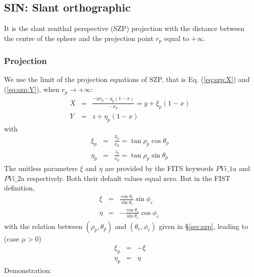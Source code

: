 \subsection{SIN: Slant orthographic}

  It is the slant zenithal perspective (SZP) projection with the distance 
  between the centre of the sphere and the projection point $r_p$ equal to $+\infty$.

  \subsubsection{Projection}

    We use the limit of the projection equations of SZP, that is Eq. (\ref{eq:szp:X}) and (\ref{eq:szp:Y}),
    when $r_p\to+\infty$:
    \begin{eqnarray}
      X & = & \frac{-yx_p-y_p(1-x)}{-x_p} = y + \xi_p(1-x) \label{eq:sin.proj.X} \\
      Y & = & z + \eta_p (1-x) \label{eq:sin.proj.Y}
    \end{eqnarray}
    with
    \begin{eqnarray}
      \xi_p  & = & \frac{y_p}{x_p} = \tan\rho_p \cos\theta_p \\
      \eta_p & = & \frac{z_p}{x_p} = \tan\rho_p \sin\theta_p
    \end{eqnarray}
    The unitless parameters $\xi$ and $\eta$ are provided by the FITS keywords $PVi\_1a$ and $PVi\_2a$
    respectively. Both their default values equal zero. But in the FIST definition, 
    \begin{eqnarray}
      \xi  & = & \frac{\cos\theta_c}{\sin\theta_c}\sin\phi_c \\
      \eta & = & -\frac{\cos\theta_c}{\sin\theta_c}\cos\phi_c\
    \end{eqnarray}
    with the relation between $(\rho_p, \theta_p)$ and $(\theta_c, \phi_c)$ given in \S \ref{sec:szp},
    leading to (case $\mu>0$)
    \begin{eqnarray}
      \xi_p & = & -\xi \\
      \eta_p & = & \eta
    \end{eqnarray}
    Demonstration:
